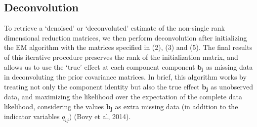 \begin{enumerate}
\subsection{Deconvolution}
To retrieve a `denoised' or `deconvoluted' estimate of the non-single rank dimensional reduction matrices, we then perform deconvolution after initializing the EM algorithm with  the matrices specified in (2), (3) and (5). The final results of this iterative procedure preserves the rank of the initialization matrix, and allows us to use the `true' effect at each component component $\bm{{b}_{j}}$ as missing data in deconvoluting the prior covariance matrices. In brief, this algorithm works by treating not only the component identity but also the true effect $\bm{{b}_{j}}$  as unobserved data, and maximizing the likelihood over the expectation of the complete data likelihood, considering the values $\bm{{b}_{j}}$ as extra missing data (in addition to the indicator variables $q_{ij}$) (Bovy et al, 2014). 
%
%
%
%
%
%
%

\end{enumerate}
